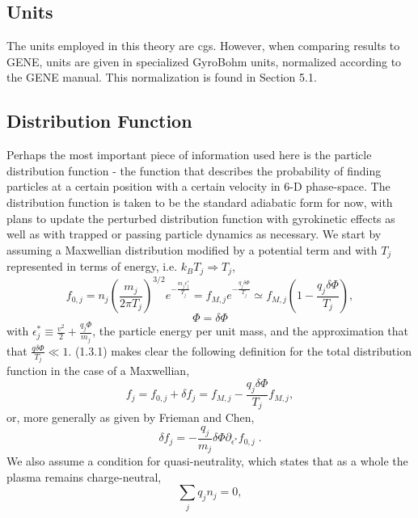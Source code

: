 \documentclass[12pt]{article}
\numberwithin{equation}{subsection}
\begin{document}
\subsection{Units}
   \quad The units employed in this theory are cgs. However, when comparing results to GENE, units are given in specialized GyroBohm units,
normalized according to the GENE manual. This normalization is found in Section 5.1.

\subsection{Distribution Function}
   \quad Perhaps the most important piece of information used here is the particle distribution function - the function that describes the
probability of finding particles at a certain position with a certain velocity in 6-D phase-space. The distribution function is taken to be
the standard adiabatic form for now, with plans to update the perturbed distribution function with gyrokinetic effects as well as with trapped
or passing particle dynamics as necessary. We start by assuming a Maxwellian distribution modified by a potential term and with $T_j$ represented
in terms of energy, i.e. $k_B T_j \Rightarrow T_j$,
   \begin{equation}
      f_{0,j} = n_j\left(\frac{m_j}{2\pi T_j}\right)^{3/2}e^{-\frac{m_j \epsilon^*_j}{T_j}}
              = f_{M,j}e^{-\frac{q_j\delta\Phi}{T_j}} \simeq f_{M,j}(1-\frac{q_j\delta\Phi}{T_j}),
   \end{equation}
   \begin{equation}
      \Phi = \delta\Phi
   \end{equation}
with $\epsilon^*_j \equiv \frac{v^2}{2} + \frac{q_j\Phi}{m_j}$, the particle energy per unit mass, and the approximation that
that $\frac{q\delta\Phi}{T_j} \ll 1$. (1.3.1) makes clear the following definition for the total distribution function in the
case of a Maxwellian,
   \begin{equation}
      f_j = f_{0,j} + \delta f_j = f_{M,j} - \frac{q_j\delta\Phi}{T_j}f_{M,j},
   \end{equation}
or, more generally as given by Frieman and Chen\cite{FriemanChen},
   \begin{equation}
      \delta f_j = -\frac{q_j}{m_j}\delta\Phi\partial_{\epsilon^*}f_{0,j}\;.
   \end{equation}
We also assume a condition for quasi-neutrality, which states that as a whole the plasma remains charge-neutral,
   \begin{equation}
      \sum\limits_{j}q_j n_j = 0,
   \end{equation}
\end{document}
